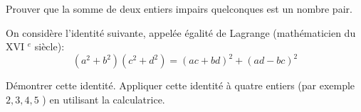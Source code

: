 \documentclass[a4paper,12pt]{report}
\begin{document}
\vspace*{-2\baselineskip}
\begin{acti}
Prouver que la somme de deux entiers impairs quelconques est un nombre pair.
\end{acti}
\begin{acti}	
On considère l'identité suivante, appelée égalité de Lagrange (mathématicien du XVI ${ }^e$ siècle):
\[
\left(a^2+b^2\right)\left(c^2+d^2\right)=(a c+b d)^2+(a d-b c)^2
\]
\begin{tasks}
\task Démontrer cette identité.
\task Appliquer cette identité à quatre entiers (par exemple $2,3,4,5$ ) en utilisant la calculatrice.
\end{tasks}
\end{acti}
\end{document}
